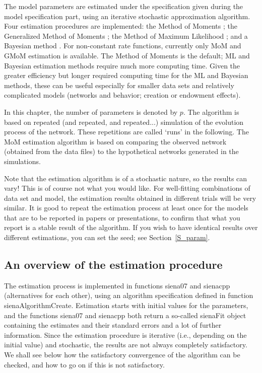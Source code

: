 \documentclass[a4paper,fleqn,11pt]{article}
\newcommand{\+}{\, + \,}
\newcommand{\sfn}[1]{\textsf{#1}}
\begin{document}
The model parameters are estimated under the specification given
during the model specification part, using an iterative stochastic
approximation algorithm.
Four estimation procedures are implemented:
the Method of Moments \citep*[`MoM';][]{Snijders01, SnijdersEA07};
the Generalized Method of Moments \citep*[`GMoM';][]{ASS2015,ASS2019};
 the Method of Maximum Likelihood \citep[`ML';][]{SnijdersEA10a};
 and a Bayesian method
 \citep{Koskinen04, KoskinenSnijders07,SchweinbergerSnijders07c}.
 For non-constant rate functions, currently only
 MoM and GMoM estimation is available.
 The Method of Moments is the default;
 ML and Bayesian estimation methods require much more computing time.
 Given the greater efficiency but longer required computing time
 for the ML and Bayesian methods,
 these can be useful especially for smaller data sets
 and relatively complicated models
 (networks and behavior; creation or endowment effects).

In this chapter, the number of
parameters is denoted by $p$. The algorithm is based on repeated
(and repeated, and repeated...) simulation of the evolution
process of the network. These repetitions are called `runs' in the
following. The MoM estimation algorithm is based on comparing the
observed network (obtained from the data files)
to the hypothetical networks generated in the simulations.

Note that the estimation algorithm is of a stochastic nature, so
the results can vary! This is of course not what you would like.
For well-fitting combinations of data set and model, the
estimation results obtained in different trials will be very
similar. It is good to repeat the estimation process at least once
for the models that are to be reported in papers or presentations,
to confirm that what you report is a stable result of the algorithm.
If you wish to have identical results over different estimations,
you can set the seed; see Section~\ref{S_param}.

\subsection{An overview of the estimation procedure}
\hypertarget{T_S_options}{   }

The estimation process is implemented in functions \textsf{siena07}
and \sfn{sienacpp} (alternatives for each other),
using an algorithm specification defined in function \textsf{sienaAlgorithmCreate}.
Estimation starts with initial values for the parameters,
and the functions \textsf{siena07} and \sfn{sienacpp} both return a
so-called \textsf{sienaFit} object containing the estimates and their standard errors and
a lot of further information.
Since the estimation procedure is iterative (i.e., depending on the
initial value) and stochastic,
the results are not always completely satisfactory. We shall see below
how the satisfactory convergence of the algorithm can be checked,
and how to go on if this is not satisfactory.
\end{document}
